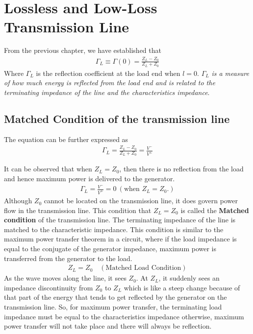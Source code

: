\chapter{Lossless and Low-Loss Transmission Line}\label{lec:lec4}
From the previous chapter, we have established that
\begin{align*}
\Gamma_L \equiv \Gamma{(0)} = \frac{Z_L - Z_0}{Z_L + Z_0}
\end{align*}
Where $\Gamma_L$ is the reflection coefficient at the load end when $l = 0$. $\Gamma_L$ \emph{is a measure of how much energy is reflected from the load end and is related to the terminating impedance of the line and the characteristics impedance}.

\section{Matched Condition of the transmission line}
The equation can be further expressed as
\begin{align*}
\Gamma_L = \frac{Z_L - Z_0}{Z_L + Z_0} =  \frac{V^-}{V^+}
\end{align*}

It can be observed that when  $Z_L = Z_0$, then there is no reflection from the load and hence maximum power is delivered to the generator.
\begin{align*}
\Gamma_L = \frac{V^-}{V^+} = 0\ (\text{when }Z_L = Z_0.) 
\end{align*}
Although $Z_0$ cannot be located on the transmission line, it does govern power flow in the transmission line. This condition that $Z_L = Z_0$ is called the \textbf{Matched condition} of the transmission line. The terminating impedance of the line is matched to the characteristic impedance. This condition is similar to the maximum power transfer theorem in a circuit, where if the load impedance is equal to the conjugate of the generator impedance, maximum power is transferred from the generator to the load. 
\begin{align*}
Z_L = Z_0 \quad (\text{Matched Load Condition})
\end{align*}
As the wave moves along the line, it sees $Z_0$. At $Z_L$, it suddenly sees an impedance discontinuity from $Z_0$ to $Z_L$ which is like a steep change because of that part of the energy that tends to get reflected by the generator on the transmission line. So, for maximum power transfer, the terminating load impedance must be equal to the characteristics impedance otherwise, maximum power transfer will not take place and there will always be reflection.

